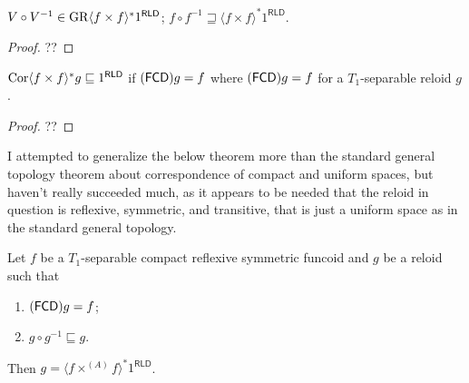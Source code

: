 \begin{cor}
  $V \circ V^{- 1} \in \operatorname{GR} \langle f \times f \rangle^{\ast} 1^{\mathsf{RLD}}$; $f
  \circ f^{- 1} \sqsupseteq \langle f \times f \rangle^{\ast} 1^{\mathsf{RLD}}$.
\end{cor}

\begin{proof}
  ??
\end{proof}

\begin{lem}
  $\operatorname{Cor} \langle f \times f \rangle^{\ast} g \sqsubseteq 1^{\mathsf{RLD}}$ if
  $(\mathsf{FCD}) g = f$ where $(\mathsf{FCD}) g = f$ for a
  $T_1$-separable reloid $g$.
\end{lem}

\begin{proof}
  ??
\end{proof}

\begin{rem}
  I attempted to generalize the below theorem more than the standard general
  topology theorem about correspondence of compact and uniform spaces, but
  haven't really succeeded much, as it appears to be needed that the reloid in
  question is reflexive, symmetric, and transitive, that is just a uniform
  space as in the standard general topology.
\end{rem}

\begin{thm}
  Let $f$ be a $T_1$-separable compact reflexive symmetric funcoid and $g$ be
  a reloid such that
  \begin{enumerate}
    \item $(\mathsf{FCD}) g = f$;
    
    \item $g \circ g^{- 1} \sqsubseteq g$.
  \end{enumerate}
  Then $g = \langle f \times^{(A)} f \rangle^{\ast} 1^{\mathsf{RLD}}$.
\end{thm}

